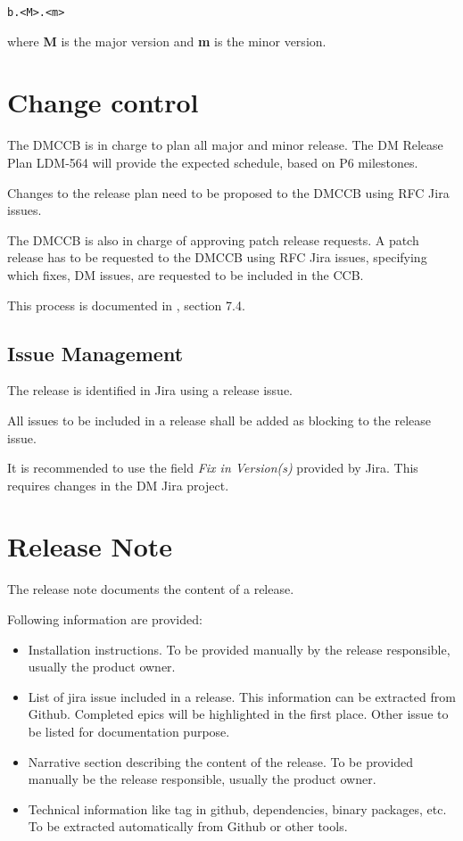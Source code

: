 \begin{verbatim}
b.<M>.<m>
\end{verbatim}

where {\bf M} is the major version and {\bf m} is the minor version.


\newpage
\section{Change control} \label{sect:changecontrol}

The DMCCB is in charge to plan all major and minor release.
The DM Release Plan LDM-564 will provide the expected schedule, based on P6 milestones.

Changes to the release plan need to be proposed to the DMCCB using RFC Jira issues.

The DMCCB is also in charge of approving patch release requests.
A patch release has to be requested to the DMCCB using RFC Jira issues, specifying which fixes, DM issues, are requested to be included in the CCB.

This process is documented in , section 7.4.


\subsection{Issue Management} \label{sect:issues}

The release is identified in Jira using a release issue.

All issues to be included in a release shall be added as blocking to the release issue.

It is recommended to use the field \textit{Fix in Version(s)} provided by Jira.
This requires changes in the DM Jira project.


\newpage
\section{Release Note} \label{sect:relnote}

The release note documents the content of a release.

Following information are provided:
\begin{itemize}
\item Installation instructions. To be provided manually by the release responsible, usually the product owner.
\item List of jira issue included in a release. This information can be extracted from Github. Completed epics will be highlighted in the first place. Other issue to be listed for documentation purpose. 
\item Narrative section describing the content of the release. To be provided manually be the release responsible, usually the product owner.
\item Technical information like tag in github, dependencies, binary packages, etc. To be extracted automatically from Github or other tools.
\end{itemize}

